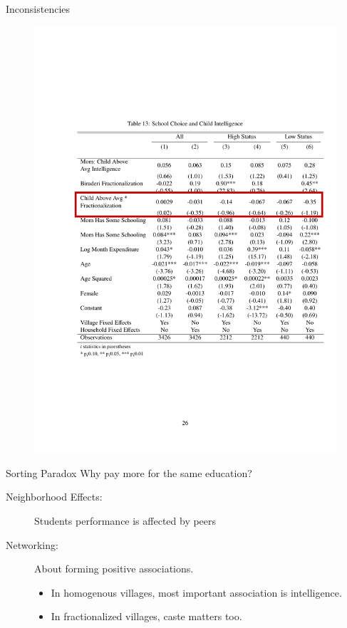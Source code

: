 \documentclass{beamer}
\begin{document}
\begin{frame}{Inconsistencies}
\begin{figure}[htb]
	\begin{center}
	\includegraphics[scale=0.65]{tables/choice_interactions_box.pdf}
	\end{center}
\end{figure}

\end{frame}



\begin{frame}{Sorting Paradox}
Why pay more for the same education?
\pause
\begin{description}
	\item [Neighborhood Effects:] Students performance is affected by peers
	\pause
	\item [Networking:] About forming positive associations. 
	\begin{itemize}
		\item In homogenous villages, most important association is intelligence.
		\item In fractionalized villages, caste matters too. 
	\end{itemize}
\end{description}
\end{frame}
\end{document}
